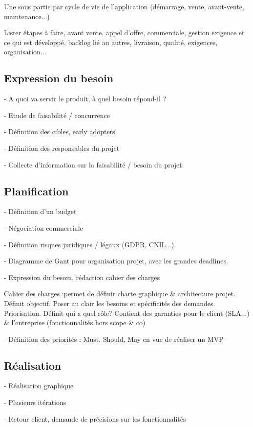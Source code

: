 

Une sous partie par cycle de vie de l'application (démarrage, vente, avant-vente, maintenance...)

Lister étapes à faire, avant vente, appel d'offre, commerciale, gestion exigence et ce qui est développé, backlog lié au autres, livraison, qualité, exigences, organisation...


\subsection{Expression du besoin}


- A quoi va servir le produit, à quel besoin répond-il ?

- Etude de faisabilité / concurrence

- Définition des cibles, early adopters.

- Définition des responsables du projet

- Collecte d'information sur la faisabilité / besoin du projet.

\subsection{Planification}

- Définition d'un budget

- Négociation commerciale

- Définition risques juridiques / légaux (GDPR, CNIL...).

- Diagramme de Gant pour organisation projet, avec les grandes deadlines.

- Expression du besoin, rédaction cahier des charges

Cahier des charges :permet de définir charte graphique \& architecture projet. Définit objectif. Poser au clair les besoins et spécificités des demandes. Priorisation. Définit qui a quel rôle? Contient des garanties pour le client (SLA...) \& l'entreprise (fonctionnalités hors scope \& co)

- Définition des priorités : Must, Should, May en vue de réaliser un MVP

\subsection{Réalisation}

- Réalisation graphique

- Plusieurs itérations

- Retour client, demande de précisions sur les fonctionnalités

